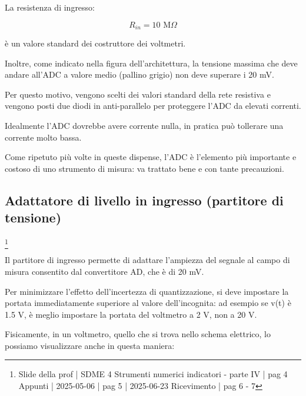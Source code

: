 La resistenza di ingresso: 

{
    \Large 
    \begin{equation}
        R_{in} = 10 \text{ M} \Omega
    \end{equation}
}

è un valore standard dei costruttore dei voltmetri. \newline 

Inoltre, come indicato nella figura dell'architettura, la tensione massima che deve andare all'ADC a valore medio (pallino grigio) 
non deve superare i 20 mV. \newline 

Per questo motivo, vengono scelti dei valori standard della rete resistiva e vengono posti due diodi in anti-parallelo per proteggere l'ADC da elevati correnti. \newline 

Idealmente l'ADC dovrebbe avere corrente nulla, in pratica può tollerare una corrente molto bassa. \newline   

Come ripetuto più volte in queste dispense, l'ADC è l'elemento più importante e costoso di uno strumento di misura: va trattato bene e con tante precauzioni. \newline 

\newpage 

\subsection{Adattatore di livello in ingresso (partitore di tensione)}
\footnote{Slide della prof | SDME 4 Strumenti numerici indicatori - parte IV | pag 4 \\  
Appunti | 2025-05-06 | pag 5 | 2025-06-23 Ricevimento | pag 6 - 7}

Il partitore di ingresso permette di adattare l'ampiezza del segnale al campo di misura consentito dal convertitore AD, che è di 20 mV. \newline 

Per minimizzare l'effetto dell'incertezza di quantizzazione, si deve impostare la portata immediatamente superiore al valore dell'incognita: 
ad esempio se v(t) è 1.5 V, è meglio impostare la portata del voltmetro a 2 V, non a 20 V. \newline 

Fisicamente, in un voltmetro, quello che si trova nello schema elettrico, lo possiamo visualizzare anche in questa maniera: 

